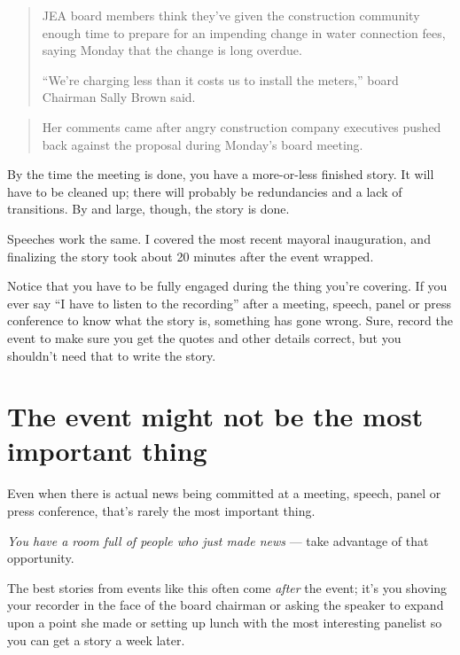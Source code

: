 \documentclass[
  12pt,
  american,
  letterpaperpaper,
  extrafontsizes,onecolumn,openright
  ]{memoir}
\begin{document}
\begin{quote}
JEA board members think they've given the construction community enough time to prepare for an impending change in water connection fees, saying Monday that the change is long overdue.

\enquote{We're charging less than it costs us to install the meters,} board Chairman Sally Brown said.
\end{quote}

\begin{quote}
Her comments came after angry construction company executives pushed back against the proposal during Monday's board meeting.
\end{quote}

By the time the meeting is done, you have a more-or-less finished story. It will have to be cleaned up; there will probably be redundancies and a lack of transitions. By and large, though, the story is done.

Speeches work the same. I covered the most recent mayoral inauguration, and finalizing the story took about 20 minutes after the event wrapped.

Notice that you have to be fully engaged during the thing you're covering. If you ever say \enquote{I have to listen to the recording} after a meeting, speech, panel or press conference to know what the story is, something has gone wrong. Sure, record the event to make sure you get the quotes and other details correct, but you shouldn't need that to write the story.

\hypertarget{the-event-might-not-be-the-most-important-thing}{%
\section*{The event might not be the most important thing}\label{the-event-might-not-be-the-most-important-thing}}

Even when there is actual news being committed at a meeting, speech, panel or press conference, that's rarely the most important thing.

\emph{You have a room full of people who just made news} --- take advantage of that opportunity.

The best stories from events like this often come \emph{after} the event; it's you shoving your recorder in the face of the board chairman or asking the speaker to expand upon a point she made or setting up lunch with the most interesting panelist so you can get a story a week later.
\end{document}
